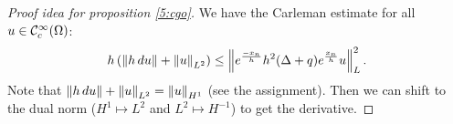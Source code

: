 \begin{proof}[Proof idea for proposition \ref{5:cgo}]
  We have the Carleman estimate for all $u \in \mathcal{C}_c^\infty(\Omega)$:
  \[ h \left( \left\lVert h \, du \right\rVert + \left\lVert u \right\rVert_{L^2} \right) \leq \left\lVert e^\frac{-x_n}h h^2 (\Delta+q) e^\frac{x_n}h u \right\rVert_L^2. \]
  Note that $\left\lVert h\, du \right\rVert + \left\lVert u \right\rVert_{L^2} = \left\lVert u \right\rVert_{H^1}$ (see the assignment).
  Then we can shift to the dual norm ($H^1 \mapsto L^2$ and $L^2 \mapsto H^{-1}$) to get the derivative.
\end{proof}
